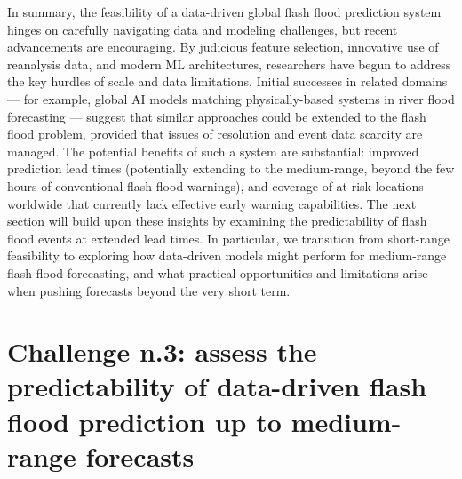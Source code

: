 In summary, the feasibility of a data-driven global flash flood prediction system hinges on carefully navigating data and modeling challenges, but recent advancements are encouraging. By judicious feature selection, innovative use of reanalysis data, and modern ML architectures, researchers have begun to address the key hurdles of scale and data limitations. Initial successes in related domains — for example, global AI models matching physically-based systems in river flood forecasting \citep{Gilon2024} — suggest that similar approaches could be extended to the flash flood problem, provided that issues of resolution and event data scarcity are managed. The potential benefits of such a system are substantial: improved prediction lead times (potentially extending to the medium-range, beyond the few hours of conventional flash flood warnings), and coverage of at-risk locations worldwide that currently lack effective early warning capabilities. The next section will build upon these insights by examining the predictability of flash flood events at extended lead times. In particular, we transition from short-range feasibility to exploring how data-driven models might perform for medium-range flash flood forecasting, and what practical opportunities and limitations arise when pushing forecasts beyond the very short term.


\section{Challenge n.3: assess the predictability of data-driven flash flood prediction up to medium-range forecasts}

